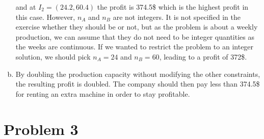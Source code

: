 \documentclass[a4paper, 10pt, twoside]{article}
\begin{document}
\begin{enumerate}[a)]
          and at $I_2 = (24.2, 60.4)$ the profit is 374.5\$ which is the highest profit in this case. However, $n_A$ and $n_B$ are not integers. It is not specified in the exercise whether they should be or not, but as the problem is about a weekly production, we can assume that they do not need to be integer quantities as the weeks are continuous. If we wanted to restrict the problem to an integer solution, we should pick $n_A = 24$ and $n_B = 60$, leading to a profit of 372\$.

    \item By doubling the production capacity without modifying the other constraints, the resulting profit is doubled. The company should then pay less than 374.5\$ for renting an extra machine in order to stay profitable.
\end{enumerate}

\section*{Problem 3}
\end{document}
